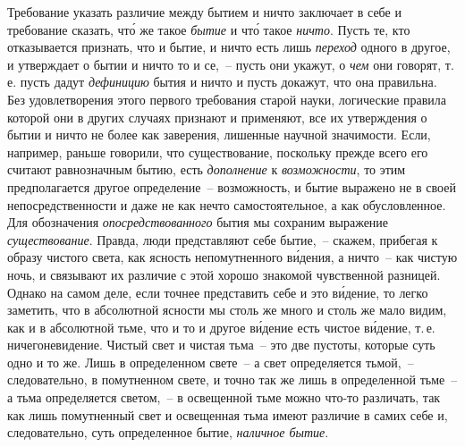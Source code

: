 Требование указать различие между бытием и ничто
заключает в себе и требование сказать, чт\'о же такое
\emph{бытие} и чт\'о такое \emph{ничто}. Пусть те, кто отказывается признать,
что и бытие, и ничто есть лишь \emph{переход} одного в
другое, и утверждает о бытии и ничто то и се,~-- пусть
они укажут, о \emph{чем} они говорят, т.\,е. пусть дадут \emph{дефиницию}
бытия и ничто и пусть докажут, что она правильна.
Без удовлетворения этого первого требования старой науки,
логические правила которой они в других случаях
признают и применяют, все их утверждения о бытии и
ничто не более как заверения, лишенные научной значимости.
Если, например, раньше говорили, что существование,
поскольку прежде всего его считают равнозначным
бытию, есть \emph{дополнение} к \emph{возможности}, то этим предполагается
другое определение~-- возможность, и бытие выражено
не в своей непосредственности и даже не как нечто
самостоятельное, а как обусловленное. Для обозначения
\emph{опосредствованного} бытия мы сохраним выражение
\emph{существование}. Правда, люди представляют себе бытие,~--
скажем, прибегая к образу чистого света, как ясность непомутненного
в\'идения, а ничто~-- как чистую ночь, и связывают
их различие с этой хорошо знакомой чувственной
разницей. Однако на самом деле, если точнее представить
себе и это в\'идение, то легко заметить, что в абсолютной
ясности мы столь же много и столь же мало видим, как
и в абсолютной тьме, что и то и другое в\'идение есть чистое
в\'идение, т.\,е. ничегоневидение. Чистый свет и чистая
тьма~-- это две пустоты, которые суть одно и то же. Лишь
в определенном свете~-- а свет определяется тьмой,~-- следовательно,
в помутненном свете, и точно так же лишь
в определенной тьме~-- а тьма определяется светом,~-- в
освещенной тьме можно что-то различать, так как лишь
помутненный свет и освещенная тьма имеют различие в
самих себе и, следовательно, суть определенное бытие,
\emph{наличное бытие}.



